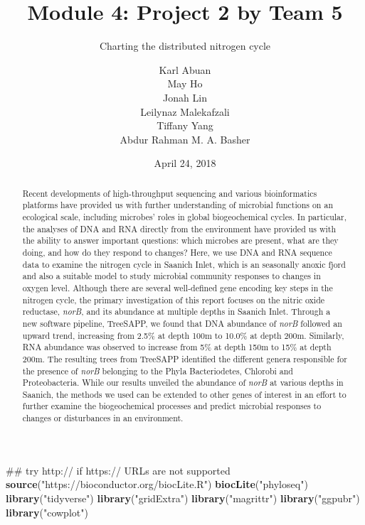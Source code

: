 \documentclass[11 pt,]{article}
\title{Module 4: Project 2 by Team 5}
\subtitle{Charting the distributed nitrogen cycle}
\author{Karl Abuan \\ May Ho \\ Jonah Lin \\ Leilynaz Malekafzali \\ Tiffany Yang \\ Abdur Rahman M. A. Basher}
\date{April 24, 2018}
\newenvironment{Shaded}{\begin{snugshade}}{\end{snugshade}}
\newcommand{\KeywordTok}[1]{\textcolor[rgb]{0.13,0.29,0.53}{\textbf{#1}}}
\newcommand{\StringTok}[1]{\textcolor[rgb]{0.31,0.60,0.02}{#1}}
\newcommand{\NormalTok}[1]{#1}
\begin{document}
\maketitle
\begin{abstract}
Recent developments of high-throughput sequencing and various
bioinformatics platforms have provided us with further understanding of
microbial functions on an ecological scale, including microbes' roles in
global biogeochemical cycles. In particular, the analyses of DNA and RNA
directly from the environment have provided us with the ability to
answer important questions: which microbes are present, what are they
doing, and how do they respond to changes? Here, we use DNA and RNA
sequence data to examine the nitrogen cycle in Saanich Inlet, which is
an seasonally anoxic fjord and also a suitable model to study microbial
community responses to changes in oxygen level. Although there are
several well-defined gene encoding key steps in the nitrogen cycle, the
primary investigation of this report focuses on the nitric oxide
reductase, \emph{norB}, and its abundance at multiple depths in Saanich
Inlet. Through a new software pipeline, TreeSAPP, we found that DNA
abundance of \emph{norB} followed an upward trend, increasing from 2.5\%
at depth 100m to 10.0\% at depth 200m. Similarly, RNA abundance was
observed to increase from 5\% at depth 150m to 15\% at depth 200m. The
resulting trees from TreeSAPP identified the different genera
responsible for the presence of \emph{norB} belonging to the Phyla
Bacteriodetes, Chlorobi and Proteobacteria. While our results unveiled
the abundance of \emph{norB} at various depths in Saanich, the methods
we used can be extended to other genes of interest in an effort to
further examine the biogeochemical processes and predict microbial
responses to changes or disturbances in an environment.
\end{abstract}

{
\hypersetup{linkcolor=black}
\setcounter{tocdepth}{3}
\tableofcontents
}
\begin{Shaded}
\begin{Highlighting}[]
\NormalTok{## try http:// if https:// URLs are not supported}
\KeywordTok{source}\NormalTok{(}\StringTok{"https://bioconductor.org/biocLite.R"}\NormalTok{)}
\KeywordTok{biocLite}\NormalTok{(}\StringTok{"phyloseq"}\NormalTok{)}
\KeywordTok{library}\NormalTok{(}\StringTok{"tidyverse"}\NormalTok{)}
\KeywordTok{library}\NormalTok{(}\StringTok{"gridExtra"}\NormalTok{)}
\KeywordTok{library}\NormalTok{(}\StringTok{"magrittr"}\NormalTok{)}
\KeywordTok{library}\NormalTok{(}\StringTok{"ggpubr"}\NormalTok{)}
\KeywordTok{library}\NormalTok{(}\StringTok{"cowplot"}\NormalTok{)}
\end{Highlighting}
\end{Shaded}
\end{document}
